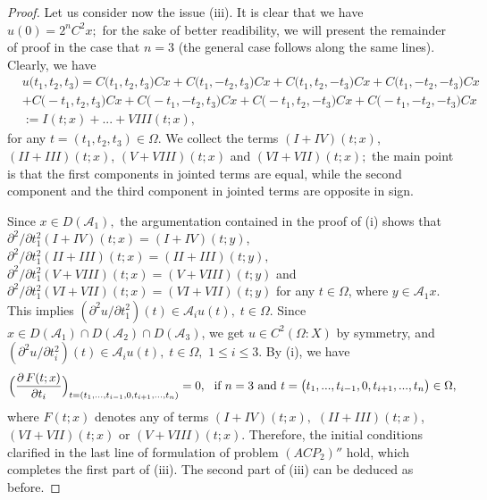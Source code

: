 \documentclass{amsart}
\theoremstyle{definition}
\theoremstyle{remark}
\numberwithin{equation}{section}
\begin{document}
\begin{proof}
Let us consider now the issue (iii). It is clear that we have $u(0)=2^{n}C^{2}x;$ for the sake of better readibility, we will present the remainder of proof in the case that $n=3$ (the general case follows along the same lines). Clearly, we have{\small
\begin{align*}  &
u\bigl(t_{1},t_{2},t_{3}\bigr)=
C\bigl(t_{1},t_{2},t_{3}\bigr)Cx+C\bigl(t_{1},-t_{2},t_{3}\bigr)Cx+
C\bigl(t_{1},t_{2},-t_{3}\bigr)Cx+
C\bigl(t_{1},-t_{2},-t_{3}\bigr)Cx
\\& +
C\bigl(-t_{1},t_{2},t_{3}\bigr)Cx+C\bigl(-t_{1},-t_{2},t_{3}\bigr)Cx+
C\bigl(-t_{1},t_{2},-t_{3}\bigr)Cx+
C\bigl(-t_{1},-t_{2},-t_{3}\bigr)Cx
\\& :=I(t;x)+...+VIII(t;x),
\end{align*}}for any $t=(t_{1},t_{2},t_{3})\in \Omega.$  
We collect the terms $(I+IV)(t;x)$, $(II+III)(t;x)$, $(V+VIII)(t;x)$ and $(VI+VII)(t;x);$ the main point is that the first components in jointed terms are equal, while the second component and the third component in jointed terms are opposite in sign. 

Since $x\in  D({\mathcal A}_{1}),$ the argumentation contained in the proof of (i) shows that 
$\partial^{2}/\partial t_{1}^{2}(I+IV)(t;x)=(I+IV)(t;y)$, 
$\partial^{2}/\partial t_{1}^{2}(II+III)(t;x)=(II+III)(t;y),$ $\partial^{2}/\partial t_{1}^{2}(V+VIII)(t;x)=(V+VIII)(t;y)$ and 
$\partial^{2}/\partial t_{1}^{2}(VI+VII)(t;x)=(VI+VII)(t;y)$ for any $t\in \Omega$, where $y\in {\mathcal A}_{1}x.$ This implies $(\partial ^{2}u/\partial t_{1}^{2})(t)\in {\mathcal A}_{i}u(t),\;t \in \Omega.$ Since $x\in D({\mathcal A}_{1}) \cap D({\mathcal A}_{2}) \cap  D({\mathcal A}_{3})$, we get $u\in C^{2}(\Omega : X)$ by symmetry, and $(\partial ^{2}u/\partial t_{i}^{2})(t)\in {\mathcal A}_{i}u(t),\;t \in \Omega,$ $1\leq i\leq 3.$ By (i), we have{\small 
$$
\Bigl( \frac{\partial \, F(t;x)}{\partial t_{i}}\Bigr)_{t=(t_{1},...,t_{i-1},0,t_{i+1},...,t_{n})}=0,\ \mbox{ if }n=3\mbox{ and }t=\bigl(t_{1},...,t_{i-1},0,t_{i+1},...,t_{n} \bigr) \in \Omega ,
$$}where $F(t;x)$ denotes any of terms $(I+IV)(t;x),$ $(II+III)(t;x)$, $ (VI+VII)(t;x)$ or $(V+VIII)(t;x).$ Therefore, the initial conditions clarified in the last line of formulation of problem $(ACP_{2})''$ hold, which completes the first part of (iii). The second part of (iii) can be deduced as before. 
\end{proof}
\end{document}
